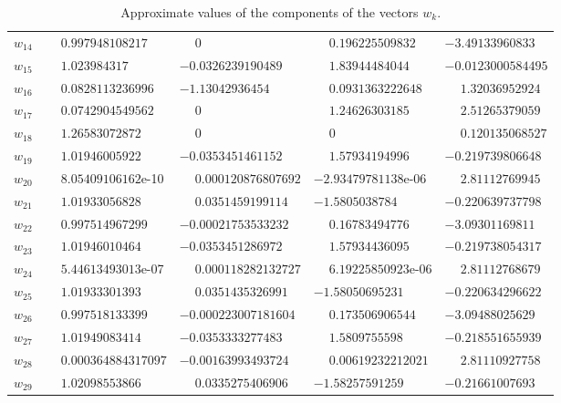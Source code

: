 \documentclass[1p]{article}
\begin{document}
\begin{table}[H]
\begin{tabular}{lllll}
        $w_{14}$ & $\phantom{-}0.997948108217$ & $\phantom{-}0$ & $\phantom{-}0.196225509832$ & $-3.49133960833$ \\
        $w_{15}$ & $\phantom{-}1.023984317$ & $-0.0326239190489$ & $\phantom{-}1.83944484044$ & $-0.0123000584495$ \\
        $w_{16}$ & $\phantom{-}0.0828113236996$ & $-1.13042936454$ & $\phantom{-}0.0931363222648$ & $\phantom{-}1.32036952924$ \\
        $w_{17}$ & $\phantom{-}0.0742904549562$ & $\phantom{-}0$ & $\phantom{-}1.24626303185$ & $\phantom{-}2.51265379059$ \\
        $w_{18}$ & $\phantom{-}1.26583072872$ & $\phantom{-}0$ & $\phantom{-}0$ & $\phantom{-}0.120135068527$ \\
        $w_{19}$ & $\phantom{-}1.01946005922$ & $-0.0353451461152$ & $\phantom{-}1.57934194996$ & $-0.219739806648$ \\
        $w_{20}$ & $\phantom{-}8.05409106162$e-10 & $\phantom{-}0.000120876807692$ & $-2.93479781138$e-06 & $\phantom{-}2.81112769945$ \\
        $w_{21}$ & $\phantom{-}1.01933056828$ & $\phantom{-}0.0351459199114$ & $-1.5805038784$ & $-0.220639737798$ \\
        $w_{22}$ & $\phantom{-}0.997514967299$ & $-0.00021753533232$ & $\phantom{-}0.16783494776$ & $-3.09301169811$ \\
        $w_{23}$ & $\phantom{-}1.01946010464$ & $-0.0353451286972$ & $\phantom{-}1.57934436095$ & $-0.219738054317$ \\
        $w_{24}$ & $\phantom{-}5.44613493013$e-07 & $\phantom{-}0.000118282132727$ & $\phantom{-}6.19225850923$e-06 & $\phantom{-}2.81112768679$ \\
        $w_{25}$ & $\phantom{-}1.01933301393$ & $\phantom{-}0.0351435326991$ & $-1.58050695231$ & $-0.220634296622$ \\
        $w_{26}$ & $\phantom{-}0.997518133399$ & $-0.000223007181604$ & $\phantom{-}0.173506906544$ & $-3.09488025629$ \\
        $w_{27}$ & $\phantom{-}1.01949083414$ & $-0.0353333277483$ & $\phantom{-}1.5809755598$ & $-0.218551655939$ \\
        $w_{28}$ & $\phantom{-}0.000364884317097$ & $-0.00163993493724$ & $\phantom{-}0.00619232212021$ & $\phantom{-}2.81110927758$ \\
        $w_{29}$ & $\phantom{-}1.02098553866$ & $\phantom{-}0.0335275406906$ & $-1.58257591259$ & $-0.21661007693$ \\
    \end{tabular}
    \caption{Approximate values of the components of the vectors $w_k$.\label{table:wk}}
\end{table}
\end{document}
